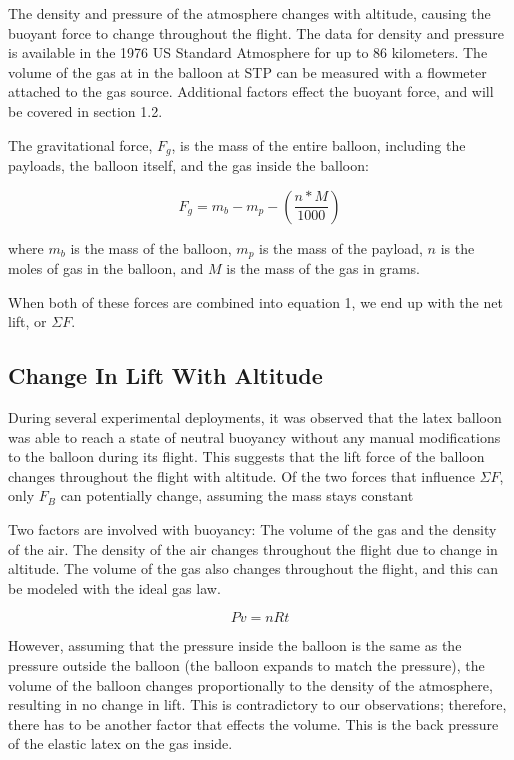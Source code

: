 \documentclass[usenatbib]{mn2e}
\newcommand{\f}[2]{\frac{#1}{#2}}
\begin{document}
The density and pressure of the atmosphere changes with altitude, causing the buoyant force to change throughout the flight. The data for density and pressure is available in the 1976 US Standard Atmosphere for up to 86 kilometers. The volume of the gas at in the balloon at STP can be measured with a flowmeter attached to the gas source. Additional factors effect the buoyant force, and will be covered in section 1.2.

The gravitational force, $F_g$, is the mass of the entire balloon, including the payloads, the balloon itself, and the gas inside the balloon:

\begin{equation}
F_{g}=m_b-m_p-(\f{n*M}{1000})
\end{equation}

where $m_b$ is the mass of the balloon, $m_p$ is the mass of the payload, $n$ is the moles of gas in the balloon, and $M$ is the mass of the gas in grams.

When both of these forces are combined into equation 1, we end up with the net lift, or $\Sigma F$.

\subsection{Change In Lift With Altitude}
\label{sec:backpressure}

During several experimental deployments, it was observed that the latex balloon was able to reach a state of neutral buoyancy without any manual modifications to the balloon during its flight. This suggests that the lift force of the balloon changes throughout the flight with altitude. Of the two forces that influence $\Sigma F$, only $F_B$ can potentially change, assuming the mass stays constant

Two factors are involved with buoyancy: The volume of the gas and the density of the air. The density of the air changes throughout the flight due to change in altitude. The volume of the gas also changes throughout the flight, and this can be modeled with the ideal gas law. 

\begin{equation}
Pv=nRt
\end{equation}

However, assuming that the pressure inside the balloon is the same as the pressure outside the balloon (the balloon expands to match the pressure), the volume of the balloon changes proportionally to the density of the atmosphere, resulting in no change in lift. This is contradictory to our observations; therefore, there has to be another factor that effects the volume. This is the back pressure of the elastic latex on the gas inside. 
\end{document}
